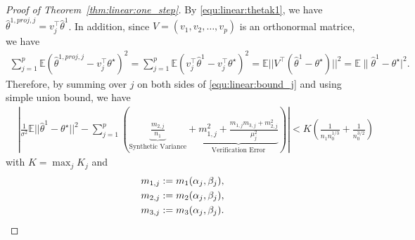 \begin{proof}[Proof of Theorem~\ref{thm:linear:one_step}]
By \eqref{equ:linear:thetak1}, we have $\hat{\theta}^{1,proj,j} =  v_j^{\top}\hat{\theta}^1$. 
In addition, since $V = (v_1,v_2, \ldots, v_p)$ is an orthonormal matrice, we have
\begin{align}
      \sum_{j=1}^p \mathbb{E}(\hat{\theta}^{1,proj,j} - v_j^{\top}\theta^\star)^2= \sum_{j=1}^p \mathbb{E}(v_j^{\top}\hat{\theta}^1 - v_j^{\top}\theta^\star)^2 = \mathbb{E} ||V^\top(\hat{\theta}^1 - \theta^\star)||^2 = \mathbb{E}\|\hat{\theta}^1 - \theta^\star|^2.
\end{align}
Therefore, by summing over $j$ on both sides of \eqref{equ:linear:bound_j} and using simple union bound, we have
\begin{align}
 &\left|\frac{1}{\sigma^2}\mathbb{E}||\hat{\theta}^1 - \theta^\star||^2 - \sum_{j=1}^p \left(\underbrace{\frac{m_{2,j}}{n_1}}_{{\text{Synthetic Variance}}} + \underbrace{m^2_{1,j}+\frac{m_{1,j}m_{3,j}+m^2_{2,j}}{\mu^2_j}}_{{\text{Verification Error}}}\right)\right| < K\left(\frac{1}{n_1n^{1/3}_0}+\frac{1}{n^{3/2}_0}\right)
 \end{align}
 with $K = \max_{j}{K_j}$ and
\begin{align}     
     m_{1,j} &:= m_1(\alpha_j,\beta_j),\notag\\
     m_{2,j} &:= m_2(\alpha_j,\beta_j),\notag\\
     m_{3,j} &:= m_3(\alpha_j,\beta_j).\notag
\end{align}

\end{proof}



